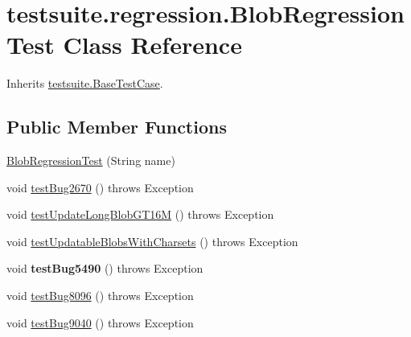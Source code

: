 \hypertarget{classtestsuite_1_1regression_1_1_blob_regression_test}{}\section{testsuite.\+regression.\+Blob\+Regression\+Test Class Reference}
\label{classtestsuite_1_1regression_1_1_blob_regression_test}


Inherits \mbox{\hyperlink{classtestsuite_1_1_base_test_case}{testsuite.\+Base\+Test\+Case}}.

\subsection*{Public Member Functions}
\begin{DoxyCompactItemize}
\item 
\mbox{\hyperlink{classtestsuite_1_1regression_1_1_blob_regression_test_a960d4c157630ea6a429f73ee43ca0c3a}{Blob\+Regression\+Test}} (String name)
\item 
void \mbox{\hyperlink{classtestsuite_1_1regression_1_1_blob_regression_test_ade5e73c4533b3bad28500f3ece35dc94}{test\+Bug2670}} ()  throws Exception 
\item 
void \mbox{\hyperlink{classtestsuite_1_1regression_1_1_blob_regression_test_a25e07d454d6ad14097ae4b5c5b1bab10}{test\+Update\+Long\+Blob\+G\+T16M}} ()  throws Exception 
\item 
void \mbox{\hyperlink{classtestsuite_1_1regression_1_1_blob_regression_test_aa201dca2fdcf014a75210d531656ab98}{test\+Updatable\+Blobs\+With\+Charsets}} ()  throws Exception 
\item 
\mbox{\label{classtestsuite_1_1regression_1_1_blob_regression_test_adbc904fc8caf8de0ac099afb41d6daa6}} 
void {\bfseries test\+Bug5490} ()  throws Exception 
\item 
void \mbox{\hyperlink{classtestsuite_1_1regression_1_1_blob_regression_test_aff4364ccb7977bcf4f76faf8ebd1a8b2}{test\+Bug8096}} ()  throws Exception 
\item 
void \mbox{\hyperlink{classtestsuite_1_1regression_1_1_blob_regression_test_ac14a4cb77c1dd15dae977435a20e0880}{test\+Bug9040}} ()  throws Exception 
\item 
\mbox{\label{classtestsuite_1_1regression_1_1_blob_regression_test_aacebe8bab74613e526801a7f2ab209d5}} 

\end{DoxyCompactItemize}
